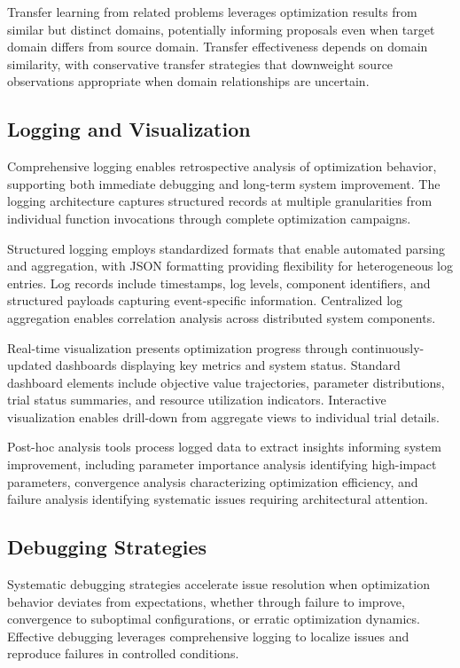 Transfer learning from related problems leverages optimization results from similar but distinct domains, potentially informing proposals even when target domain differs from source domain. Transfer effectiveness depends on domain similarity, with conservative transfer strategies that downweight source observations appropriate when domain relationships are uncertain.

\subsection{Logging and Visualization}

Comprehensive logging enables retrospective analysis of optimization behavior, supporting both immediate debugging and long-term system improvement. The logging architecture captures structured records at multiple granularities from individual function invocations through complete optimization campaigns.

Structured logging employs standardized formats that enable automated parsing and aggregation, with JSON formatting providing flexibility for heterogeneous log entries. Log records include timestamps, log levels, component identifiers, and structured payloads capturing event-specific information. Centralized log aggregation enables correlation analysis across distributed system components.

Real-time visualization presents optimization progress through continuously-updated dashboards displaying key metrics and system status. Standard dashboard elements include objective value trajectories, parameter distributions, trial status summaries, and resource utilization indicators. Interactive visualization enables drill-down from aggregate views to individual trial details.

Post-hoc analysis tools process logged data to extract insights informing system improvement, including parameter importance analysis identifying high-impact parameters, convergence analysis characterizing optimization efficiency, and failure analysis identifying systematic issues requiring architectural attention.

\subsection{Debugging Strategies}

Systematic debugging strategies accelerate issue resolution when optimization behavior deviates from expectations, whether through failure to improve, convergence to suboptimal configurations, or erratic optimization dynamics. Effective debugging leverages comprehensive logging to localize issues and reproduce failures in controlled conditions.

